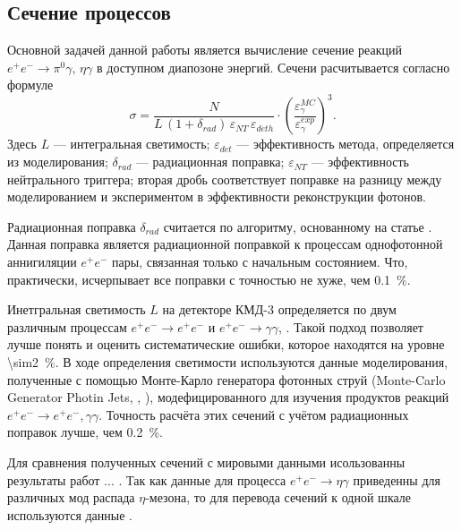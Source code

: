 \subsection{Сечение процессов}

Основной задачей данной работы является вычисление сечение реакций
$e^+e^- \to \pi^0 \gamma, \, \eta \gamma$ в доступном диапозоне энергий.
Сечени расчитывается согласно формуле
\begin{equation}
	\sigma = \frac{ N } { L \, (1+\delta_{rad}) \, \varepsilon_{NT} \,
	\varepsilon_{deth}} \cdot  
	\left( \frac{ {\varepsilon^{MC}_{\gamma}} }{ {\varepsilon^{exp}_{\gamma}} } \right)^3.
\end{equation}
Здесь $L$ --- интегральная светимость;
$\varepsilon_{det}$ --- эффективность метода, определяется из моделирования;
$\delta_{rad}$ --- радиационная поправка;
$\varepsilon_{NT}$ --- эффективность нейтрального триггера;
вторая дробь соответствует поправке на разницу между моделированием и экспериментом в эффективности
реконструкции фотонов.

Радиационная поправка $\delta_{rad}$ считается по алгоритму, основанному на статье \cite{Kuraev1985}.
Данная поправка является радиационной поправкой к процессам однофотонной аннигиляции $e^+ e^-$ пары,
связанная только с начальным состоянием.
Что, практически, исчерпывает все поправки с точностью не хуже, чем \SI{0.1}{\percent}.

Инетгральная светимость $L$ на детекторе КМД-3 определяется по двум различным процессам
$e^+e^- \to e^+e^-$ и $e^+e^- \to \gamma \gamma$, \cite{lumAkhmetshin2012b}.
Такой подход позволяет лучше понять и оценить систематические ошибки, которое находятся на уровне \SI{\sim2}{\percent}.
В ходе определения светимости используются данные моделирования,
полученные с помощью Монте-Карло генератора фотонных струй (Monte-Carlo Generator Photin Jets, \cite{Arbuzov2006}, \cite{Actis2010}),
модефицированного для изучения продуктов реакций  $e^+e^- \to e^+e^-, \gamma \gamma$.
Точность расчёта этих сечений с учётом радиационных поправок лучше, чем \SI{0.2}{\percent}.

Для сравнения полученных сечений с мировыми данными исользованны результаты работ ... .
Так как данные для процесса $e^+ e^- \to \eta \gamma$ приведенны для различных мод распада $\eta$-мезона,
то для перевода сечений к одной шкале используются данные \cite{Beringer:1900zz}.

